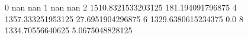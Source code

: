 0 nan nan
1 nan nan
2 1510.8321533203125 181.194091796875
4 1357.333251953125 27.6951904296875
6 1329.6380615234375 0.0
8 1334.70556640625 5.0675048828125
